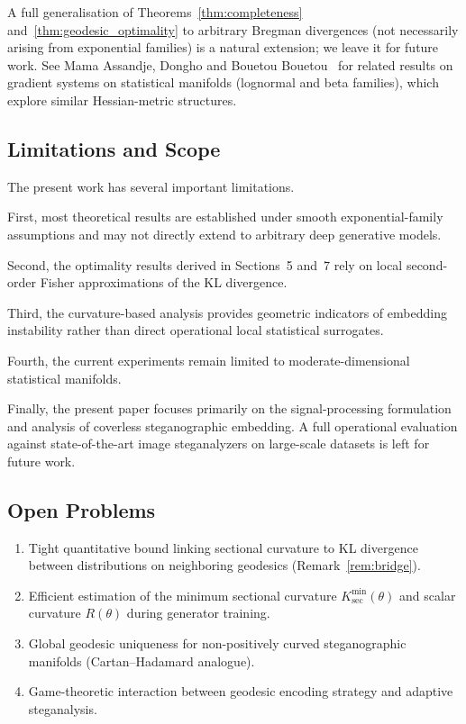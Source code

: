 \documentclass[a4paper,fleqn]{cas-dc}
\begin{document}
A full generalisation of Theorems~\ref{thm:completeness}
and~\ref{thm:geodesic_optimality} to arbitrary Bregman divergences
(not necessarily arising from exponential families) is a natural
extension; we leave it for future work.
See Mama Assandje, Dongho and Bouetou Bouetou~\cite{mama2023chaos,mama2024infogeom}
for related results on gradient systems on statistical manifolds
(lognormal and beta families), which explore similar Hessian-metric
structures.



\subsection{Limitations and Scope}\label{sec:limitations}

The present work has several important limitations.

First, most theoretical results are established under smooth exponential-family assumptions and may not directly extend to arbitrary deep generative models.

Second, the optimality results derived in Sections~5 and~7 rely on local second-order Fisher approximations of the KL divergence.

Third, the curvature-based analysis provides geometric indicators of embedding instability rather than direct operational local statistical surrogates.

Fourth, the current experiments remain limited to moderate-dimensional
statistical manifolds.

Finally, the present paper focuses primarily on the signal-processing
formulation and analysis of coverless steganographic embedding. A full
operational evaluation against state-of-the-art image steganalyzers on
large-scale datasets is left for future work.

\subsection{Open Problems}

\begin{enumerate}
  \item Tight quantitative bound linking sectional curvature to KL
        divergence between distributions on neighboring geodesics
        (Remark~\ref{rem:bridge}).
  \item Efficient estimation of the minimum sectional curvature
        $K_{\sec}^{\min}(\theta)$ and scalar curvature $R(\theta)$
        during generator training.
  \item Global geodesic uniqueness for non-positively curved
        steganographic manifolds (Cartan--Hadamard analogue).
  \item Game-theoretic interaction between geodesic encoding strategy
        and adaptive steganalysis.
\end{enumerate}
\end{document}
